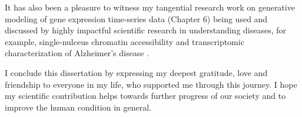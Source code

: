 It has also been a pleasure to witness my tangential research work on generative modeling of gene expression time-series data (Chapter 6) being used and discussed by highly impactful scientific research in understanding diseases, for example, single-nulceus chromatin accessibility and transcriptomic characterization of Alzheimer's disease \citep{morabito2021single}.

I conclude this dissertation by expressing my deepest gratitude, love and friendship to everyone in my life, who supported me through this journey.  I hope my scientific contribution helps towards further progress of our society and to improve the human condition in general.
